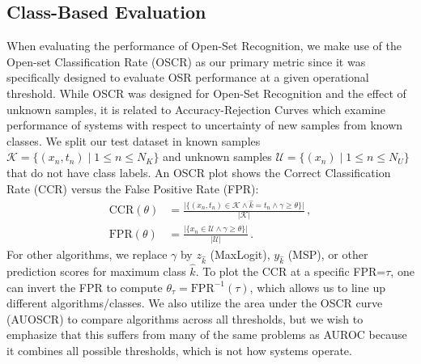 \iffalse
\begin{algorithm}
\SetKwInOut{Input}{Input}\SetKwInOut{Output}{Output}
  \Input{$F(x)$, a DNN's an $N$-dimensional pre-logit feature Vector of sample $x$;  $F(x)[n]$ be the value at dimension $n$ of $F(x)$}
  \Input{Gauss\_models[k] = $[\mu_{n,k},\sigma_{n,k}]$\;}
  \Input{ $x =$ test sample}
  \Input{ $\ell(x)$ the max logit value for input $x$}
  \Input{$m(x)$ the class with maximum logit value for input $x$, }
  \Output{$\gamma(x)$  = GHOST Outlier detection score}
  \Begin{
       Let  $z(x) = \sum_n{ \frac{F(x)[n]-\mu_{n,m(x)}}{\sigma_{n,m(x)}}} $ \;
       return  $\gamma(x)  = \frac{\ell(x)}{z(x)}$ \;
        
  }

  \caption{Computing GHOST Outlier Detection Score;}
  \label{a:ghost}
\end{algorithm}
\fi

\subsection{Class-Based Evaluation}
\label{sec:metrics}
When evaluating the performance of Open-Set Recognition, we make use of the Open-set Classification Rate (OSCR) \cite{dhamija2018reducing} as our primary metric since it was specifically designed to evaluate OSR performance at a given operational threshold.
While OSCR was designed for Open-Set Recognition and the effect of unknown samples, it is related to Accuracy-Rejection Curves which examine performance of systems with respect to uncertainty of new samples from known classes\cite{nadeem2009accuracy}.
We split our test dataset in known samples $\mathcal K = \{(x_n, t_n)\mid 1\leq n\leq N_K\}$ and unknown samples $\mathcal U = \{(x_n)\mid 1\leq n \leq N_U\}$ that do not have class labels.
An OSCR plot shows the Correct Classification Rate (CCR) versus the False Positive Rate (FPR):
\begin{equation}
  \begin{aligned}
      \mathrm{CCR}(\theta)&= \frac{\bigl|\{(x_n,t_n) \in \mathcal K \wedge \hat k = t_n \wedge \gamma \geq \theta \}\bigr|}{|\mathcal K|}\,,\\
      \label{eq:oscr}
      \mathrm{FPR}(\theta)&= \frac{\bigl|\{x_n \in \mathcal U \wedge \gamma \geq \theta \}\bigr|}{|\mathcal U|}\,.
  \end{aligned}
\end{equation}
For other algorithms, we replace $\gamma$ by $z_{\hat k}$ (MaxLogit), $y_{\hat k}$ (MSP), or other prediction scores for maximum class $\hat k$.
To plot the CCR at a specific FPR=$\tau$, one can invert the FPR to compute $\theta_{\tau}=\mathrm{FPR}^{-1}(\tau)$, which allows us to line up different algorithms/classes.
We also utilize the area under the OSCR curve (AUOSCR) to compare algorithms across all thresholds, but we wish to emphasize that this suffers from many of the same problems as AUROC because it combines all possible thresholds, which is not how systems operate.   

